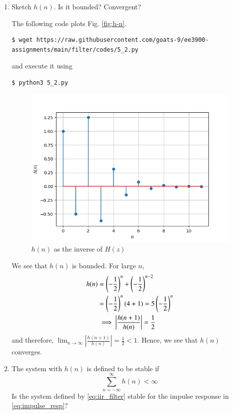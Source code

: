 \documentclass[journal,12pt,twocolumn]{IEEEtran}
\renewcommand\thesection{\arabic{section}}
\begin{document}
\begin{enumerate}[label=\thesection.\arabic*]
\item Sketch $h(n)$. Is it bounded? Convergent? 

\solution The following code plots Fig. \eqref{fig:h-n}.
\begin{lstlisting}
$ wget https://raw.githubusercontent.com/goats-9/ee3900-assignments/main/filter/codes/5_2.py
\end{lstlisting}
and execute it using
\begin{lstlisting}
$ python3 5_2.py
\end{lstlisting}

\begin{figure}[!ht]
	\centering
	\includegraphics[width=\columnwidth]{figs/5_2.png}
	\caption{$h(n)$ as the inverse of $H(z)$}
	\label{fig:h-n}
\end{figure}
We see that $h(n)$ is bounded. For large $n$,
\begin{align}
	h(n) &= \left(-\frac{1}{2}\right)^n + \left(-\frac{1}{2}\right)^{n - 2} \\
		 &= \left(-\frac{1}{2}\right)^{n}\left(4 + 1\right) = 5\left(-\frac{1}{2}\right)^n \\
		 &\implies \left|\frac{h(n + 1)}{h(n)}\right| = \frac{1}{2}
\end{align}
and therefore, $\lim_{n \to \infty}\left|\frac{h(n + 1)}{h(n)}\right| = \frac{1}{2} < 1$. Hence, we see that $h(n)$ converges.  
\item The system with $h(n)$ is defined to be stable if
\begin{equation}
\sum_{n=-\infty}^{\infty}h(n) < \infty
\end{equation}
Is the system defined by \eqref{eq:iir_filter} stable for the impulse response in \eqref{eq:impulse_resp}?


\end{enumerate}
\end{document}
